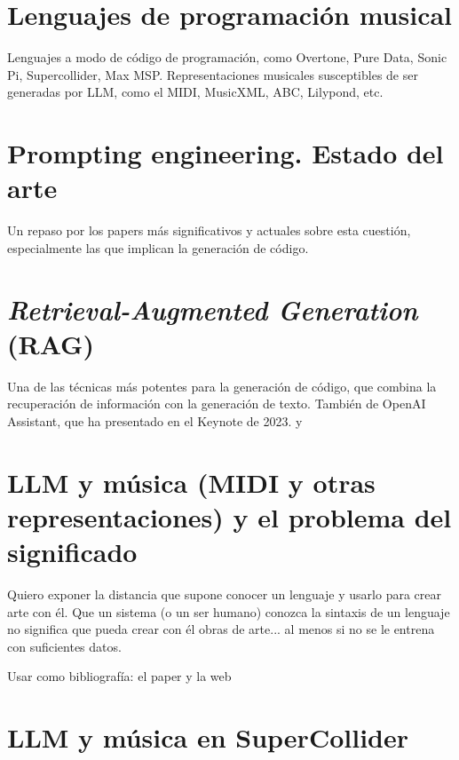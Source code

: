 \section{Lenguajes de programación musical}
    Lenguajes a modo de código de programación, como Overtone, Pure Data, Sonic Pi, Supercollider, Max MSP. Representaciones musicales susceptibles de ser generadas por LLM, como el MIDI, MusicXML, ABC, Lilypond, etc.

\section{Prompting engineering. Estado del arte}
    Un repaso por los papers más significativos y actuales sobre esta cuestión, especialmente las que implican la generación de código.

\section{\textit{Retrieval-Augmented Generation} (RAG)}
    Una de las técnicas más potentes para la generación de código, que combina la recuperación de información con la generación de texto. También de OpenAI Assistant, que ha presentado en el Keynote de 2023. \cite{WhatRetrievalaugmentedGeneration2021} y \cite{lewisRetrievalAugmentedGenerationKnowledgeIntensive2021}

\section{LLM y música (MIDI y otras representaciones) y el problema del significado}
    Quiero exponer la distancia que supone conocer un lenguaje y usarlo para crear arte con él. Que un sistema (o un ser humano) conozca la sintaxis de un lenguaje no significa que pueda crear con él obras de arte... al menos si no se le entrena con suficientes datos.
    
    Usar como bibliografía: el paper \cite{lewisRetrievalAugmentedGenerationKnowledgeIntensive2021} y la web \cite{WhatRetrievalaugmentedGeneration2021}

\section{LLM y música en SuperCollider}